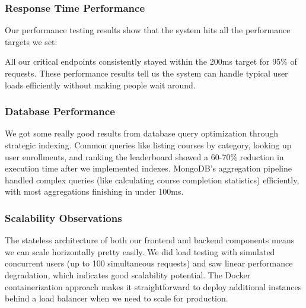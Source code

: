 \documentclass[final,3p,times,twocolumn]{elsarticle}
\begin{document}
\subsubsection{Response Time Performance}

Our performance testing results show that the system hits all the performance targets we set:

\begin{table}[htbp]
\centering
{}
\caption{API endpoint response time performance}
\label{tab:performance}
\end{table}

All our critical endpoints consistently stayed within the 200ms target for 95\% of requests. These performance results tell us the system can handle typical user loads efficiently without making people wait around.

\subsubsection{Database Performance}

We got some really good results from database query optimization through strategic indexing. Common queries like listing courses by category, looking up user enrollments, and ranking the leaderboard showed a 60-70\% reduction in execution time after we implemented indexes. MongoDB's aggregation pipeline handled complex queries (like calculating course completion statistics) efficiently, with most aggregations finishing in under 100ms.

\subsubsection{Scalability Observations}

The stateless architecture of both our frontend and backend components means we can scale horizontally pretty easily. We did load testing with simulated concurrent users (up to 100 simultaneous requests) and saw linear performance degradation, which indicates good scalability potential. The Docker containerization approach makes it straightforward to deploy additional instances behind a load balancer when we need to scale for production.
\end{document}
